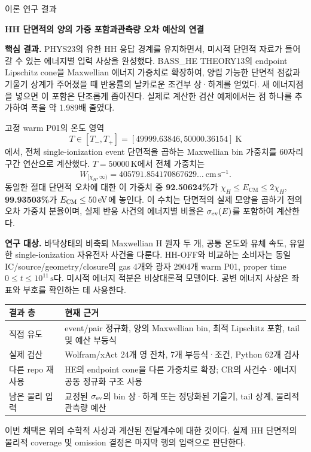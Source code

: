 \documentclass[11pt,a4paper]{article}
\newcommand{\sig}{\sigma_{\rm ev}}\newcommand{\cm}{\mathrm{CM}}\newcommand{\lab}{\mathrm{lab}}\newcommand{\hh}{\mathrm{HH}}
\begin{document}
{\large\sffamily 이론 연구 결과}\par
{\LARGE\bfseries HH 단면적의 양의 가중 포함과\newline 관측량 오차 예산의 연결}\par
\vspace{2mm}
\textbf{핵심 결과.} PHYS23의 유한 HH 응답 경계를 유지하면서, 미시적 단면적 자료가 들어갈 수 있는 에너지별 입력 사상을 완성했다. BASS\_HE THEORY13의 endpoint Lipschitz cone을 Maxwellian 에너지 가중치로 확장하여, 양립 가능한 단면적 점값과 기울기 상계가 주어졌을 때 반응률의 날카로운 조건부 상·하계를 얻었다. 새 에너지점을 넣으면 이 포함은 단조롭게 좁아진다. 실제로 계산한 검산 예제에서는 점 하나를 추가하여 폭을 약 1.989배 줄였다.

고정 warm P01의 온도 영역
\begin{equation}
T\in[T_-,T_+]=[49999.63846,50000.36154]\ \mathrm K
\end{equation}
에서, 전체 single-ionization event 단면적을 곱하는 Maxwellian bin 가중치를 60자리 구간 연산으로 계산했다. $T=50000\,\mathrm K$에서 전체 가중치는
\begin{equation}
W_{[\chi_H,\infty)}=405791.854170867629\ldots\ \mathrm{cm\,s^{-1}}.
\end{equation}
동일한 절대 단면적 오차에 대한 이 가중치 중 \textbf{92.50624\%}가 $\chi_H\le E_{\cm}\le2\chi_H$, \textbf{99.93503\%}가 $E_{\cm}\le50\,\eV$에 놓인다. 이 수치는 단면적의 실제 모양을 곱하기 전의 오차 가중치 분율이며, 실제 반응 사건의 에너지별 비율은 $\sig(E)$를 포함하여 계산한다.

\textbf{연구 대상.} 바닥상태의 비축퇴 Maxwellian H 원자 두 개, 공통 온도와 유체 속도, 유일한 single-ionization 자유전자 사건을 다룬다. HH-OFF와 비교하는 소비자는 동일 IC/source/geometry/closure의 gas 4개와 광자 2904개 warm P01, proper time $0\le t\le10^{11}\,\mathrm s$다. 미시적 에너지 적분은 비상대론적 모델이다. 공변 에너지 사상은 좌표와 부호를 확인하는 데 사용한다.

\begin{center}\begin{tabularx}{\linewidth}{@{}p{29mm}X@{}}\toprule
결과 층 & 현재 근거\\\midrule
직접 유도 & event/pair 정규화, 양의 Maxwellian bin, 최적 Lipschitz 포함, tail 및 예산 부등식\\
실제 검산 & Wolfram/xAct 24개 영 잔차, 7개 부등식·조건, Python 62개 검사\\
다른 repo 재사용 & HE의 endpoint cone을 다른 가중치로 확장; CR의 사건수·에너지 공동 정규화 구조 사용\\
남은 물리 입력 & 교정된 $\sig$의 bin 상·하계 또는 정당화된 기울기, tail 상계, 물리적 관측량 예산\\\bottomrule
\end{tabularx}\end{center}
이번 채택은 위의 수학적 사상과 계산된 전달계수에 대한 것이다. 실제 HH 단면적의 물리적 coverage 및 omission 결정은 마지막 행의 입력으로 판단한다.
\end{document}
